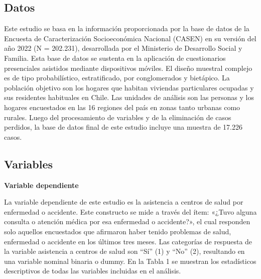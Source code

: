 \documentclass[
  12pt,
  a4paper,
]{article}
\begin{document}
\hypertarget{datos}{%
\subsection{Datos}\label{datos}}

Este estudio se basa en la información proporcionada por la base de datos de la Encuesta de Caracterización Socioeconómica Nacional (CASEN) en su versión del año 2022 (N = 202.231), desarrollada por el Ministerio de Desarrollo Social y Familia. Esta base de datos se sustenta en la aplicación de cuestionarios presenciales asistidos mediante dispositivos móviles. El diseño muestral complejo es de tipo probabilístico, estratificado, por conglomerados y bietápico. La población objetivo son los hogares que habitan viviendas particulares ocupadas y sus residentes habituales en Chile. Las unidades de análisis son las personas y los hogares encuestados en las 16 regiones del país en zonas tanto urbanas como rurales. Luego del procesamiento de variables y de la eliminación de casos perdidos, la base de datos final de este estudio incluye una muestra de 17.226 casos.

\hypertarget{variables}{%
\subsection{Variables}\label{variables}}

\textbf{Variable dependiente}

La variable dependiente de este estudio es la asistencia a centros de salud por enfermedad o accidente. Este constructo se mide a través del ítem: «¿Tuvo alguna consulta o atención médica por esa enfermedad o accidente?», el cual responden solo aquellos encuestados que afirmaron haber tenido problemas de salud, enfermedad o accidente en los últimos tres meses. Las categorías de respuesta de la variable asistencia a centros de salud son ``Sí'' (1) y ``No'' (2), resultando en una variable nominal binaria o dummy. En la Tabla 1 se muestran los estadísticos descriptivos de todas las variables incluidas en el análisis.
\end{document}
